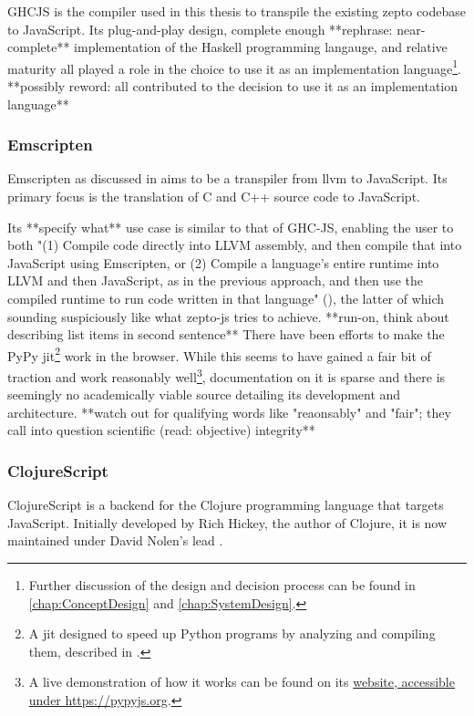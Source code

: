 \documentclass[oneside,11pt,xetex]{scrbook}
\begin{document}
GHCJS is the compiler used in this thesis to transpile the existing zepto codebase
to JavaScript. Its plug-and-play design, complete enough **rephrase: near-complete** implementation of the
Haskell programming langauge, and relative maturity all played a role in the choice
to use it as an implementation language\footnote{Further discussion of the design
and decision process can be found in \ref{chap:ConceptDesign} and
\ref{chap:SystemDesign}.}. **possibly reword: all contributed to the decision to use it as an implementation language**

\subsubsection{Emscripten}

Emscripten as discussed in \parencite{ZAKA} aims to be a transpiler from \gls{llvm} to
JavaScript. Its primary focus is the translation of C and C++ source code
to JavaScript.

Its **specify what** use case is similar to that of GHC-JS, enabling the user to both "(1)
Compile code directly into LLVM assembly, and then compile that into JavaScript
using Emscripten, or (2) Compile a language’s entire runtime into LLVM and then
JavaScript, as in the previous approach, and then use the compiled runtime to
run code written in that language" (\cite{ZAKA}), the latter of which sounding
suspiciously like what zepto-js tries to achieve. **run-on, think about describing list items in second sentence** There have been efforts to
make the PyPy \gls{jit}\footnote{A \gls{jit} designed to speed up Python programs
by analyzing and compiling them, described in \parencite{PYPY}.} work in the
browser. While this seems to have gained a fair bit of traction and work
reasonably well\footnote{A live demonstration of how it works can be found on
its \href{https://pypyjs.org}{website, accessible under https://pypyjs.org}.},
documentation on it is sparse and there is seemingly no academically viable
source detailing its development and architecture. **watch out for qualifying words like "reaonsably" and "fair"; they call into question scientific (read: objective) integrity**

\subsubsection{ClojureScript}
\label{sec:ClojureScript}

ClojureScript is a backend for the Clojure programming language that targets
JavaScript. Initially developed by Rich Hickey, the author of Clojure, it is
now maintained under David Nolen's lead \parencite{CLJS}.
\end{document}
